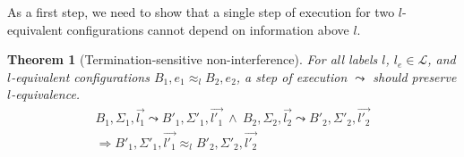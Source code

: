 \documentclass[10pt,preprint]{sigplanconf}
\newtheorem{theorem}{Theorem}
\begin{document}
As a first step, we need to show that a single step of execution for two $l$-equivalent configurations cannot depend on information above $l$.

\begin{theorem}[Termination-sensitive non-interference]
  For all labels $l$, $l_e \in \mathcal{L}$, and $l$-equivalent configurations $B_1,e_1 \approx_l B_2,e_2$, a step of execution $\leadsto$ should preserve $l$-equivalence.
  \begin{align*}
    B_1,\Sigma_1, \vec{l_1} \leadsto B'_1,\Sigma'_1, \vec{l'_1} ~\wedge~B_2,\Sigma_2,\vec{l_2} \leadsto B'_2,\Sigma'_2, \vec{l'_2} \\
    \Rightarrow B'_1,\Sigma'_1, \vec{l'_1} \approx_l B'_2,\Sigma'_2, \vec{l'_2}
  \end{align*}
\end{theorem}
\end{document}
